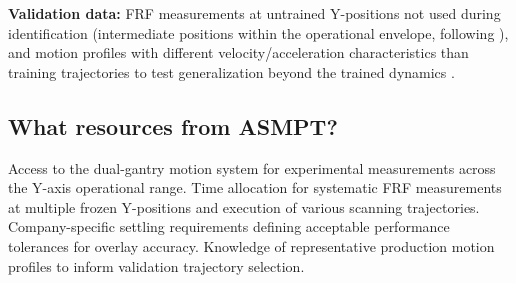 \textbf{Validation data:} FRF measurements at untrained Y-positions not used during identification (intermediate positions within the operational envelope, following \citet{paijmans2008identification}), and motion profiles with different velocity/acceleration characteristics than training trajectories to test generalization beyond the trained dynamics \citep{toth2010modeling}.

\subsection{What resources from ASMPT?}

Access to the dual-gantry motion system for experimental measurements across the Y-axis operational range. Time allocation for systematic FRF measurements at multiple frozen Y-positions and execution of various scanning trajectories. Company-specific settling requirements defining acceptable performance tolerances for overlay accuracy. Knowledge of representative production motion profiles to inform validation trajectory selection.













